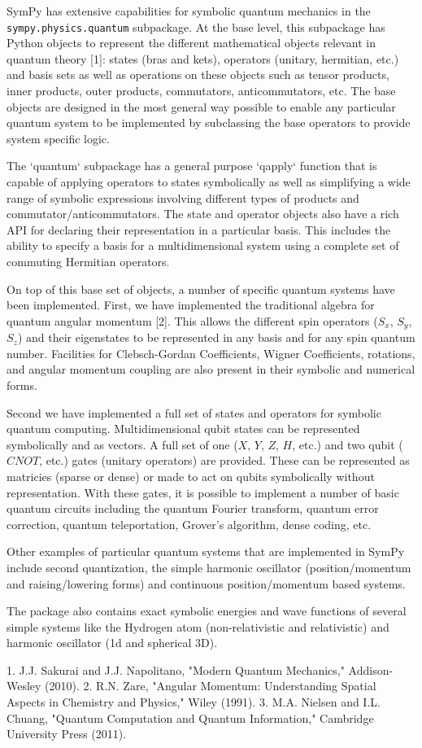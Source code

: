 SymPy has extensive capabilities for symbolic quantum mechanics in the
\verb|sympy.physics.quantum| subpackage. At the base level, this subpackage has
Python objects to represent the different mathematical objects relevant in
quantum theory [1]: states (bras and kets), operators (unitary, hermitian,
etc.) and basis sets as well as operations on these objects such as tensor
products, inner products, outer products, commutators, anticommutators, etc.
The base objects are designed in the most general way possible to enable any
particular quantum system to be implemented by subclassing the base operators
to provide system specific logic.

The `quantum` subpackage has a general purpose `qapply` function that is
capable of applying operators to states symbolically as well as simplifying a
wide range of symbolic expressions involving different types of products and
commutator/anticommutators. The state and operator objects also have a rich API
for declaring their representation in a particular basis. This includes the
ability to specify a basis for a multidimensional system using a complete set
of commuting Hermitian operators.

On top of this base set of objects, a number of specific quantum systems have
been implemented. First, we have implemented the traditional algebra for
quantum angular momentum [2]. This allows the different spin operators ($S_x$,
$S_y$, $S_z$) and their eigenstates to be represented in any basis and for any
spin quantum number. Facilities for Clebsch-Gordan Coefficients, Wigner
Coefficients, rotations, and angular momentum coupling are also present in
their symbolic and numerical forms.

Second we have implemented a full set of states and operators for symbolic
quantum computing. Multidimensional qubit states can be represented
symbolically and as vectors. A full set of one ($X$, $Y$, $Z$, $H$, etc.) and
two qubit ($CNOT$, etc.) gates (unitary operators) are provided. These can be
represented as matricies (sparse or dense) or made to act on qubits
symbolically without representation. With these gates, it is possible to
implement a number of basic quantum circuits including the quantum Fourier
transform, quantum error correction, quantum teleportation, Grover's algorithm,
dense coding, etc.

Other examples of particular quantum systems that are implemented in SymPy
include second quantization, the simple harmonic oscillator (position/momentum
and raising/lowering forms) and continuous position/momentum based systems.

The package also contains exact symbolic energies and wave functions of several
simple systems like the Hydrogen atom (non-relativistic and relativistic) and
harmonic oscillator (1d and spherical 3D).

1. J.J. Sakurai and J.J. Napolitano, "Modern Quantum Mechanics," Addison-Wesley
(2010).
2. R.N. Zare, "Angular Momentum: Understanding Spatial Aspects in Chemistry and
Physics," Wiley (1991).
3. M.A. Nielsen and I.L. Chuang, "Quantum Computation and Quantum Information,"
Cambridge University Press (2011).


